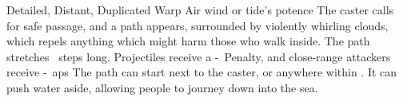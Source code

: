   {Detailed, Distant, Duplicated}%
  {Warp}%
  {Air}%
  {wind or tide's potence}%
  {The caster calls for safe passage, and a path appears, surrounded by violently whirling clouds, which repels anything which might harm those who walk inside.
  The path stretches ~\glspl{step} long.
  Projectiles receive a -~Penalty, and close-range attackers receive -~\glspl{ap}}%
  {
  The path can start next to the caster, or anywhere within \spellRange.
  It can push water aside, allowing people to journey down into the sea.}
